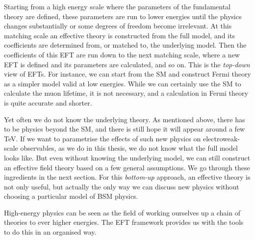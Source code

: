 Starting from a high energy scale where the parameters of the
fundamental theory are defined, these parameters are run to lower
energies until the physics changes substantially or some degrees of
freedom become irrelevant. At this matching scale an effective
theory is constructed from the full model, and its coefficients are
determined from, or matched to, the underlying model. Then the
coefficients of this EFT are run down to the next matching scale,
where a new EFT is defined and its parameters are calculated, and so
on. This is the \emph{top-down} view of EFTs. For instance, we can
start from the SM and construct Fermi theory as a simpler model valid
at low energies. While we can certainly use the SM to calculate the
muon lifetime, it is not necessary, and a calculation in Fermi theory
is quite accurate and shorter.

Yet often we do not know the underlying theory. As mentioned above,
there has to be physics beyond the SM, and there is still hope it will
appear around a few TeV. If we want to parametrise the effects of such
new physics on electroweak-scale observables, as we do in this thesis,
we do not know what the full model looks like. But even without
knowing the underlying model, we can still construct an effective
field theory based on a few general assumptions. We go through these
ingredients in the next section. For this \emph{bottom-up} approach,
an effective theory is not only useful, but actually the only way we
can discuss new physics without choosing a particular model of BSM
physics.

High-energy physics can be seen as the field of working ourselves up a
chain of theories to ever higher energies. The EFT framework provides
us with the tools to do this in an organised way.



